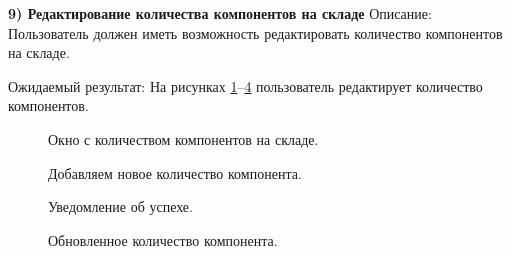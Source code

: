 \textbf{9) Редактирование количества компонентов на складе}
Описание: Пользователь должен иметь возможность редактировать количество компонентов на складе.

Ожидаемый результат: На рисунках \ref{stored:warehouse0}--\ref{stored:stock2} пользователь редактирует количество компонентов.

\begin{figure}[ht]
	\caption{Окно с количеством компонентов на складе.}
	\label{stored:warehouse0}
\end{figure}

\begin{figure}[ht]
	\caption{Добавляем новое количество компонента.}
	\label{stored:stock0}
\end{figure}

\begin{figure}[ht]
	\caption{Уведомление об успехе.}
	\label{stored:stock1}
\end{figure}

\begin{figure}[ht]
	\caption{Обновленное количество компонента.}
	\label{stored:stock2}
\end{figure}

\clearpage